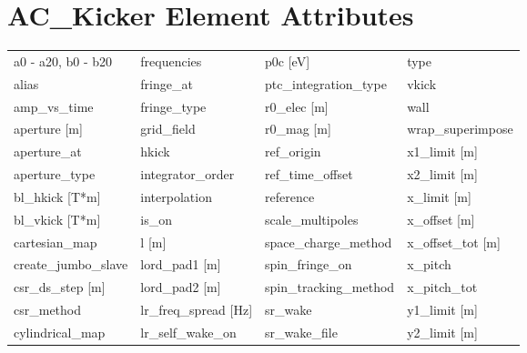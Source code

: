  \section{AC_Kicker Element Attributes}
 \label{s:list.ac.kicker}
 
 \begin{tabular}{llll} \toprule
a0 - a20, b0 - b20               & frequencies                      & p0c [eV]                         & type                             \\
alias                            & fringe_at                        & ptc_integration_type             & vkick                            \\
amp_vs_time                      & fringe_type                      & r0_elec [m]                      & wall                             \\
aperture [m]                     & grid_field                       & r0_mag [m]                       & wrap_superimpose                 \\
aperture_at                      & hkick                            & ref_origin                       & x1_limit [m]                     \\
aperture_type                    & integrator_order                 & ref_time_offset                  & x2_limit [m]                     \\
bl_hkick [T*m]                   & interpolation                    & reference                        & x_limit [m]                      \\
bl_vkick [T*m]                   & is_on                            & scale_multipoles                 & x_offset [m]                     \\
cartesian_map                    & l [m]                            & space_charge_method              & x_offset_tot [m]                 \\
create_jumbo_slave               & lord_pad1 [m]                    & spin_fringe_on                   & x_pitch                          \\
csr_ds_step [m]                  & lord_pad2 [m]                    & spin_tracking_method             & x_pitch_tot                      \\
csr_method                       & lr_freq_spread [Hz]              & sr_wake                          & y1_limit [m]                     \\
cylindrical_map                  & lr_self_wake_on                  & sr_wake_file                     & y2_limit [m]                     \\

\end{tabular}
